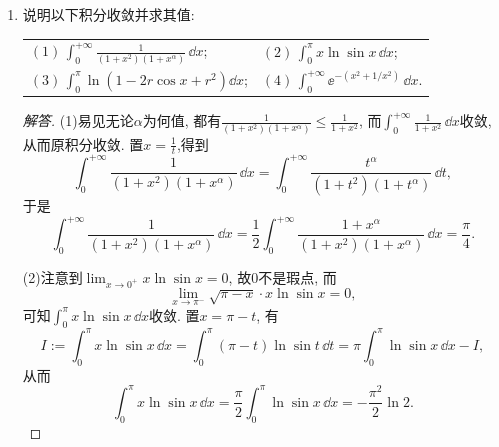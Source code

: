 \begin{a}
\begin{enumerate}
\begin{proof}[解答]
当 $p>1$ 时，易见 \(\int_{1}^{+\infty} x^{\frac{1}{p}-1}(\ln x) \sin x \, d x\) 
与级数 \(\sum_{n=1}^{\infty} \int_{n \pi}^{(n+1) \pi} x^{\frac{1}{p}-1}(\ln x) \sin x \, d x\) 有相同的敛散性。
当 $x>e^{\frac{p}{p-1}}$ 时 $x^{\frac{1}{p}-1}(\ln x)$ 单调减少趋于$0$。因此，对足够大的$n$，
\[(-1)^n\int_{n\pi}^{(n+1)\pi}x^{\frac{1}{p}-1}(\ln x)\sin x \, dx
=\int_0^\pi(n\pi+x)^{\frac{1}{p}-1}(\ln(n\pi+x))\sin x \, dx\]
单调减少趋于$0$。因此，积分 \(\int_{1}^{+\infty} \frac{\ln x}{x^{-p}} \, d x\) 收敛。

总之，原积分收敛的充分必要条件是 $|p|>1$。
\end{proof}
\item 说明以下积分收敛并求其值:\\
\begin{center}\begin{tabular}{ll}
\((1)\,\int_{0}^{+\infty}\frac{1}{(1+x^2)(1+x^\alpha)}\,\dd x\);&
\((2)\,\int_{0}^{\pi}x\ln\sin x\,\dd x\);\\
\((3)\,\int_{0}^{\pi}\ln\left(1-2r\cos x+r^2\right)\dd x\);&
\((4)\,\int_{0}^{+\infty}\ee^{-(x^2+1/x^2)}\,\dd x\).
\end{tabular}\end{center}

\begin{proof}[解答]
(1)易见无论\(\alpha\)为何值, 都有\(\frac{1}{(1+x^2)(1+x^\alpha)}\leqslant\frac{1}{1+x^2}\), 
而\(\int_{0}^{+\infty}\frac{1}{1+x^2}\,\dd x\)收敛, 从而原积分收敛. 
置\(x=\frac{1}{t}\),得到
\[\int_{0}^{+\infty}\frac{1}{(1+x^2)(1+x^\alpha)}\,\dd x
=\int_{0}^{+\infty}\frac{t^\alpha}{(1+t^2)(1+t^\alpha)}\,\dd t,\]
于是\[\int_{0}^{+\infty}\frac{1}{(1+x^2)(1+x^\alpha)}\,\dd x
=\frac{1}{2}\int_{0}^{+\infty}\frac{1+x^\alpha}{(1+x^2)(1+x^\alpha)}\,\dd x=\frac{\pi}{4}.\]

(2)注意到\(\lim_{x\rightarrow 0^+}x\ln\sin x=0\), 故\(0\)不是瑕点, 而
\[\lim_{x\rightarrow \pi^-}\sqrt{\pi-x}\cdot x\ln\sin x=0,\]
可知\(\int_{0}^{\pi}x\ln\sin x\,\dd x\)收敛. 置\(x=\pi-t\), 有
\[I:=\int_{0}^{\pi}x\ln\sin x\,\dd x=\int_{0}^{\pi}(\pi-t)\ln\sin t\,\dd t
=\pi\int_{0}^{\pi}\ln\sin x\,\dd x-I,\]
从而\[\int_{0}^{\pi}x\ln\sin x\,\dd x
=\frac{\pi}{2}\int_{0}^{\pi}\ln\sin x\,\dd x=-\frac{\pi^2}{2}\ln 2.\]


\end{proof}
\end{enumerate}
\end{a}
